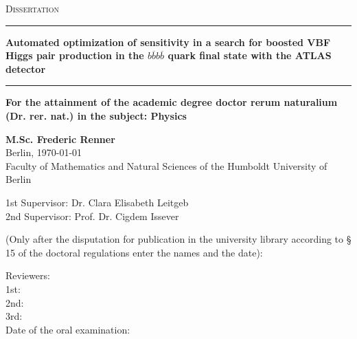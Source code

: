 
\begin{titlepage}
    \begin{center}
	{\scshape\Large Dissertation\\}
	\vspace{.1cm}
	\rule[1pt]{\textwidth}{1.5pt}
    \LARGE{\textbf{Automated optimization of sensitivity in a search for boosted VBF Higgs pair production in the $b\overline{b}b\overline{b}$ quark final state with the ATLAS detector
	}}
    \rule[11pt]{\textwidth}{1.5pt}
	
    {\normalsize\textbf{For the attainment of the academic degree doctor rerum naturalium (Dr. rer. nat.) in the subject: Physics}} 
    \vspace{1cm}

    \Large{\textbf{M.Sc. Frederic Renner\\}}
	Berlin, \today\\
    \vspace{1cm}
    \large
	Faculty of Mathematics and Natural Sciences of the Humboldt University of Berlin\\
    \vspace{1cm}

	1st Supervisor: Dr. Clara Elisabeth Leitgeb\\
	2nd Supervisor: Prof. Dr. Cigdem Issever
	\vspace{01cm}


	\newpage 
	(Only after the disputation for publication in the university library according to § 15	of the doctoral regulations enter the names and the date):\\
	\raggedright
	Reviewers: \\
	1st: \\
	2nd: \\
	3rd: \\
	
	Date of the oral examination: 
\end{center}
\end{titlepage}